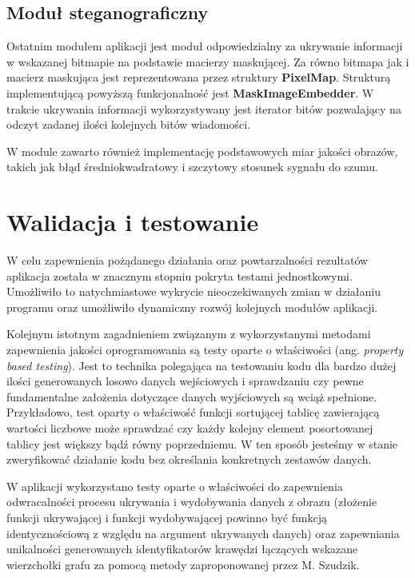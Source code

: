 {{        \subsection{Moduł steganograficzny}
        {
            Ostatnim modułem aplikacji jest moduł odpowiedzialny za ukrywanie informacji w wskazanej bitmapie na
            podstawie macierzy maskującej. Za równo bitmapa jak i macierz maskująca jest reprezentowana przez struktury
            \textbf{PixelMap}. Strukturą implementującą powyższą funkcjonalność jest \textbf{MaskImageEmbedder}. W
            trakcie ukrywania informacji wykorzystywany jest iterator bitów pozwalający na odczyt zadanej ilości
            kolejnych bitów wiadomości.

            W module zawarto również implementację podstawowych miar jakości obrazów, takich jak błąd średniokwadratowy
            i szczytowy stosunek sygnału do szumu.
        }
    }



    \section{Walidacja i testowanie}
    {
        W celu zapewnienia pożądanego działania oraz powtarzalności rezultatów aplikacja została w znacznym stopniu
        pokryta testami jednostkowymi. Umożliwiło to natychmiastowe wykrycie nieoczekiwanych zmian w działaniu programu
        oraz umożliwiło dynamiczny rozwój kolejnych modułów aplikacji.

        Kolejnym istotnym zagadnieniem związanym z wykorzystanymi metodami zapewnienia jakości oprogramowania są testy
        oparte o właściwości (ang. \textit{property based testing}). Jest to technika polegająca na testowaniu kodu dla
        bardzo dużej ilości generowanych losowo danych wejściowych i sprawdzaniu czy pewne fundamentalne założenia
        dotyczące danych wyjściowych są wciąż spełnione. Przykładowo, test oparty o właściwość funkcji sortującej
        tablicę zawierającą wartości liczbowe może sprawdzać czy każdy kolejny element posortowanej tablicy jest większy
        bądź równy poprzedniemu. W ten sposób jesteśmy w stanie zweryfikować działanie kodu bez określania konkretnych
        zestawów danych.

        W aplikacji wykorzystano testy oparte o właściwości do zapewnienia odwracalności procesu ukrywania i wydobywania
        danych z obrazu (złożenie funkcji ukrywającej i funkcji wydobywającej powinno być funkcją identycznościową z
        względu na argument ukrywanych danych) oraz zapewniania unikalności generowanych identyfikatorów krawędzi
        łączących wskazane wierzchołki grafu za pomocą metody zaproponowanej przez M. Szudzik\cite{SzudzikFn}.

}}

